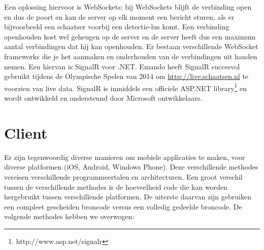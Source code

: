 Een oplossing hiervoor is WebSockets: bij WebSockets blijft de verbinding open en dus de poort en kan de server op elk moment een bericht sturen, als er bijvoorbeeld een schaatser voorbij een detectie-lus komt. Een verbinding openhouden kost wel geheugen op de server en de server heeft dus een maximum aantal verbindingen dat hij kan openhouden. Er bestaan verschillende WebSocket frameworks die je het aanmaken en onderhouden van de verbindingen uit handen nemen. Een hiervan is SignalR voor .NET. Emando heeft SignalR succesvol gebruikt tijdens de Olympische Spelen van 2014 om \url{http://live.schaatsen.nl} te voorzien van live data. SignalR is inmiddels een officiele ASP.NET library\footnote{http://www.asp.net/signalr} en wordt ontwikkeld en ondersteund door Microsoft ontwikkelaars.

\section{Client}
Er zijn tegenwoordig diverse manieren om mobiele applicaties te maken, voor diverse platformen (iOS, Android, Windows Phone). Deze verschillende methodes vereisen verschillende programmeertalen en architecturen. Een groot verschil tussen de verschillende methodes is de hoeveelheid code die kan worden hergebruikt tussen verschillende platformen. De uiterste daarvan zijn gebruiken een compleet gescheiden broncode versus een volledig gedeelde broncode. De volgende methodes hebben we overwogen:

